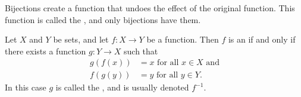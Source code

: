 Bijections create a function that undoes the effect of the original function. This function is called the , and only bijections have them.

\begin{definition}
    Let $X$ and $Y$ be sets, and let $f: X \to Y$ be a function. Then $f$ is an  if and only if there exists a function $g: Y \to X$ such that
    \begin{align*}
        g(f(x)) &= x \text{ for all } x \in X \text{ and}\\
        f(g(y)) &= y \text{ for all } y \in Y.
    \end{align*}
    In this case $g$ is called the , and is usually denoted $f^{-1}$.
\end{definition}

